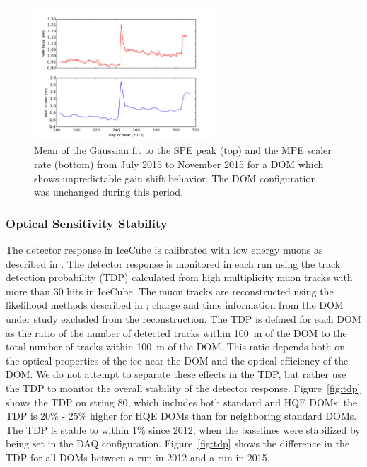 \begin{figure}[!h]
 \centering
 \includegraphics[width=0.6\textwidth]{graphics/dom/reliability/gainshift.pdf}
 \caption{Mean of the Gaussian fit to the SPE peak (top) and the MPE
   scaler rate (bottom) from July 2015 to November 2015 for a DOM
   which shows unpredictable gain shift behavior. The DOM
   configuration was unchanged during this period.}
 \label{fig:gainshift_spe}
\end{figure}

\subsubsection{Optical Sensitivity Stability}

The detector response in IceCube is calibrated with low energy muons as
described in \cite{IC3:ereco}. The detector response is monitored in each run using the track
detection probability (TDP) calculated from high
multiplicity muon tracks with more than 30 hits in IceCube. The muon
tracks are reconstructed using the likelihood methods described in
\cite{IC3:ereco}; charge and time information from the DOM under study excluded
from the reconstruction. The TDP is
defined for each DOM as the ratio of the number of detected tracks
within 100~m of the DOM to the total number of tracks within 100~m of
the DOM. This ratio depends both on the optical properties of the ice
near the DOM and the optical efficiency of the DOM. We do not attempt
to separate
these effects in the TDP, but rather use the TDP to monitor the
overall stability of the detector response. Figure~\ref{fig:tdp} shows the TDP on
string 80, which includes both standard and HQE DOMs; the TDP is
20\% - 25\% higher for HQE DOMs than for neighboring standard
DOMs. The TDP is stable to within 1\% since 2012, when the baselines
were stabilized by being set in the DAQ configuration. Figure~\ref{fig:tdp} shows
the difference in the TDP for all DOMs between a run in 2012 and a run
in 2015.

